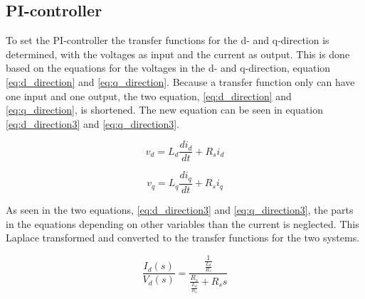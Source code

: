 \subsection{PI-controller}

To set the PI-controller the transfer functions for the d- and q-direction is determined, with the voltages as input and the current as output. This is done based on the equations for the voltages in the d- and q-direction, equation \ref{eq:d_direction} and \ref{eq:q_direction}.
Because a transfer function only can have one input and one output, the two equation, \ref{eq:d_direction} and \ref{eq:q_direction}, is shortened. The new equation can be seen in equation \ref{eq:d_direction3} and \ref{eq:q_direction3}.

\begin{equation}
    \label{eq:d_direction3}
    v_d = L_d \frac{d i_d}{dt} + R_s i_d
\end{equation}

\begin{equation}
    \label{eq:q_direction3}
    v_q = L_q \frac{d i_q}{dt} + R_s i_q
\end{equation}

As seen in the two equations, \ref{eq:d_direction3} and \ref{eq:q_direction3}, the parts in the equations depending on other variables than the current is neglected. 
This Laplace transformed and converted to the transfer functions for the two systems.

\begin{equation}
    \frac{I_d(s)}{V_d(s)} = \frac{ \frac{1}{ \frac{L_d}{R_s} } }{ \frac{R_s}{ \frac{L_d}{R_s} } + R_s s }
\end{equation}
